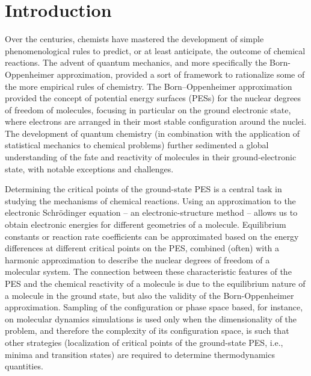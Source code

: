\documentclass[9pt,bestpractices]{livecoms}
\begin{document}
\tableofcontents


\section{Introduction}

Over the centuries, chemists have mastered the development of simple phenomenological rules to predict, or at least anticipate, the outcome of chemical reactions. The advent of quantum mechanics, and more specifically the Born-Oppenheimer approximation, provided a sort of framework to rationalize some of the more empirical rules of chemistry. The Born--Oppenheimer approximation provided the concept of potential energy surfaces (PESs) for the nuclear degrees of freedom of molecules, focusing in particular on the ground electronic state, where electrons are arranged in their most stable configuration around the nuclei. The development of quantum chemistry (in combination with the application of statistical mechanics to chemical problems) further sedimented a global understanding of the fate and reactivity of molecules in their ground-electronic state, with notable exceptions and challenges.\cite{carpenter2005nonstatistical,tantillo2021beyond} 

Determining the critical points of the ground-state PES is a central task in studying the mechanisms of chemical reactions. Using an approximation to the electronic Schr\"{o}dinger equation -- an electronic-structure method -- allows us to obtain electronic energies for different geometries of a molecule. Equilibrium constants or reaction rate coefficients can be approximated based on the energy differences at different critical points on the PES, combined (often) with a harmonic approximation to describe the nuclear degrees of freedom of a molecular system. The connection between these characteristic features of the PES and the chemical reactivity of a molecule is due to the equilibrium nature of a molecule in the ground state, but also the validity of the Born-Oppenheimer approximation. Sampling of the configuration or phase space based, for instance, on molecular dynamics simulations is used only when the dimensionality of the problem, and therefore the complexity of its configuration space, is such that other strategies (localization of critical points of the ground-state PES, i.e., minima and transition states) are required to determine thermodynamics quantities.
\end{document}
